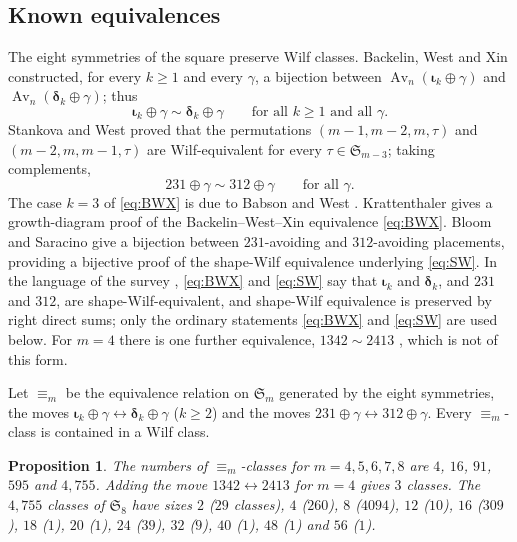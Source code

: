 \documentclass[11pt,reqno]{amsart}
\theoremstyle{plain}
\newtheorem{proposition}[proposition]{Proposition}
\theoremstyle{definition}
\theoremstyle{remark}
\newcommand{\Av}{\operatorname{Av}}
\let\greekiota\iota
\renewcommand{\iota}{\boldsymbol{\greekiota}}
\newcommand{\dd}{\boldsymbol{\delta}}
\newcommand{\Sym}{\mathfrak{S}}
\begin{document}
\subsection{Known equivalences}\label{sec:known}
The eight symmetries of the square preserve Wilf classes. Backelin, West and Xin \cite{BWX2007} constructed, for every $k\ge1$ and every $\gamma$, a bijection between $\Av_n(\iota_k\oplus\gamma)$ and $\Av_n(\dd_k\oplus\gamma)$; thus
\begin{equation}\label{eq:BWX}
\iota_k\oplus\gamma\sim\dd_k\oplus\gamma\qquad\text{for all }k\ge1\text{ and all }\gamma .
\end{equation}
Stankova and West \cite{StankovaWest2002} proved that the permutations $(m-1,m-2,m,\tau)$ and $(m-2,m,m-1,\tau)$ are Wilf-equivalent for every $\tau\in\Sym_{m-3}$; taking complements,
\begin{equation}\label{eq:SW}
231\oplus\gamma\sim312\oplus\gamma\qquad\text{for all }\gamma .
\end{equation}
The case $k=3$ of \eqref{eq:BWX} is due to Babson and West
\cite{BabsonWest2000}. Krattenthaler \cite{Krattenthaler2006} gives a
growth-diagram proof of the Backelin--West--Xin equivalence
\eqref{eq:BWX}. Bloom and Saracino \cite{BloomSaracino2014} give a
bijection between $231$-avoiding and $312$-avoiding placements,
providing a bijective proof of the shape-Wilf equivalence underlying
\eqref{eq:SW}. In the language of the survey \cite{Vatter2026}, \eqref{eq:BWX} and \eqref{eq:SW} say that $\iota_k$ and $\dd_k$, and $231$ and $312$, are shape-Wilf-equivalent, and shape-Wilf equivalence is preserved by right direct sums; only the ordinary statements \eqref{eq:BWX} and \eqref{eq:SW} are used below. For $m=4$ there is one further equivalence, $1342\sim2413$ \cite{Stankova1994}, which is not of this form.

Let $\equiv_m$ be the equivalence relation on $\Sym_m$ generated by the eight symmetries, the moves $\iota_k\oplus\gamma\leftrightarrow\dd_k\oplus\gamma$ ($k\ge2$) and the moves $231\oplus\gamma\leftrightarrow312\oplus\gamma$. Every $\equiv_m$-class is contained in a Wilf class.

\begin{proposition}\label{prop:classes}
The numbers of $\equiv_m$-classes for $m=4,5,6,7,8$ are $4$, $16$, $91$, $595$ and $4{,}755$. Adding the move $1342\leftrightarrow2413$ for $m=4$ gives $3$ classes. The $4{,}755$ classes of $\Sym_8$ have sizes $2$ ($29$ classes), $4$ ($260$), $8$ ($4094$), $12$ ($10$), $16$ ($309$), $18$ ($1$), $20$ ($1$), $24$ ($39$), $32$ ($9$), $40$ ($1$), $48$ ($1$) and $56$ ($1$).
\end{proposition}
\end{document}
